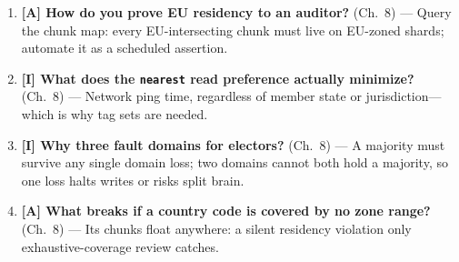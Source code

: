 \begin{enumerate}
    \item \textbf{[A] How do you prove EU residency to an auditor?} (Ch.~8) --- Query the chunk map: every EU-intersecting chunk must live on EU-zoned shards; automate it as a scheduled assertion.
    \item \textbf{[I] What does the \texttt{nearest} read preference actually minimize?} (Ch.~8) --- Network ping time, regardless of member state or jurisdiction---which is why tag sets are needed.
    \item \textbf{[I] Why three fault domains for electors?} (Ch.~8) --- A majority must survive any single domain loss; two domains cannot both hold a majority, so one loss halts writes or risks split brain.
    \item \textbf{[A] What breaks if a country code is covered by no zone range?} (Ch.~8) --- Its chunks float anywhere: a silent residency violation only exhaustive-coverage review catches.
\end{enumerate}


